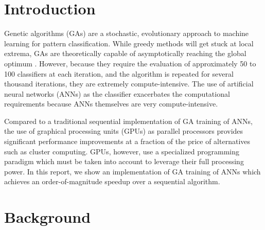\documentclass[11pt]{article}       %
\begin{document}
\section{Introduction} \label{intro}
Genetic algorithms (GAs) are a stochastic, evolutionary approach to machine learning for pattern classification. While greedy methods will get stuck at local extrema, GAs  are theoretically capable of asymptotically reaching the global optimum \cite{GA-ANN}. However, because they require the evaluation of approximately 50 to 100 classifiers at each iteration, and the algorithm is repeated for several thousand iterations, they are extremely compute-intensive. The use of artificial neural networks (ANNs) as the classifier exacerbates the computational requirements because ANNs themselves are very compute-intensive.

Compared to a traditional sequential implementation of GA training of ANNs, the use of graphical processing units (GPUs) as parallel processors provides significant performance improvements at a fraction of the price of alternatives such as cluster computing. GPUs, however, use a specialized programming paradigm which must be taken into account to leverage their full processing power. In this report, we show an implementation of GA training of ANNs which achieves an order-of-magnitude speedup over a sequential algorithm.

\section{Background} \label{background}

\end{document}
